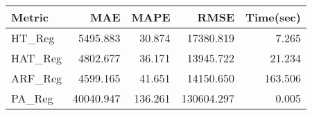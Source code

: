 \begin{tabular}{lrrrr}
\toprule
Metric &       MAE &    MAPE &       RMSE &  Time(sec) \\
\midrule
HT\_Reg  &  5495.883 &  30.874 &  17380.819 &      7.265 \\
HAT\_Reg &  4802.677 &  36.171 &  13945.722 &     21.234 \\
ARF\_Reg &  4599.165 &  41.651 &  14150.650 &    163.506 \\
PA\_Reg  & 40040.947 & 136.261 & 130604.297 &      0.005 \\
\bottomrule
\end{tabular}
